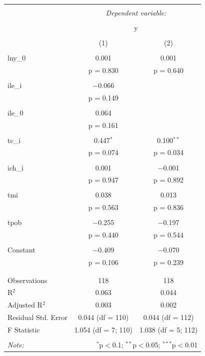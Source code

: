\begin{table}[!htbp] \centering 
    \tiny
  \caption{} 
  \label{} 
\begin{tabular}{@{\extracolsep{5pt}}lcc} 
\\[-1.8ex]\hline 
\hline \\[-1.8ex] 
 & \multicolumn{2}{c}{\textit{Dependent variable:}} \\ 
\cline{2-3} 
\\[-1.8ex] & \multicolumn{2}{c}{y} \\ 
\\[-1.8ex] & (1) & (2)\\ 
\hline \\[-1.8ex] 
 lny\_0 & 0.001 & 0.001 \\ 
  & p = 0.830 & p = 0.640 \\ 
  & & \\ 
 ile\_i & $-$0.066 &  \\ 
  & p = 0.149 &  \\ 
  & & \\ 
 ile\_0 & 0.064 &  \\ 
  & p = 0.161 &  \\ 
  & & \\ 
 tc\_i & 0.447$^{*}$ & 0.100$^{**}$ \\ 
  & p = 0.074 & p = 0.034 \\ 
  & & \\ 
 ich\_i & 0.001 & $-$0.001 \\ 
  & p = 0.947 & p = 0.892 \\ 
  & & \\ 
 tmi & 0.038 & 0.013 \\ 
  & p = 0.563 & p = 0.836 \\ 
  & & \\ 
 tpob & $-$0.255 & $-$0.197 \\ 
  & p = 0.440 & p = 0.544 \\ 
  & & \\ 
 Constant & $-$0.409 & $-$0.070 \\ 
  & p = 0.106 & p = 0.239 \\ 
  & & \\ 
\hline \\[-1.8ex] 
Observations & 118 & 118 \\ 
R$^{2}$ & 0.063 & 0.044 \\ 
Adjusted R$^{2}$ & 0.003 & 0.002 \\ 
Residual Std. Error & 0.044 (df = 110) & 0.044 (df = 112) \\ 
F Statistic & 1.054 (df = 7; 110) & 1.038 (df = 5; 112) \\ 
\hline 
\hline \\[-1.8ex] 
\textit{Note:}  & \multicolumn{2}{r}{$^{*}$p$<$0.1; $^{**}$p$<$0.05; $^{***}$p$<$0.01} \\ 
\end{tabular} 
\end{table} 



